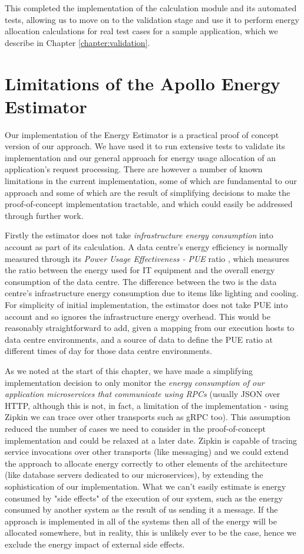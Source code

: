 This completed the implementation of the calculation module and its automated tests, allowing us to move on to the validation stage and use it to perform energy allocation calculations for real test cases for a sample application, which we describe in Chapter \ref{chapter:validation}.

\section{Limitations of the Apollo Energy Estimator}

Our implementation of the Energy Estimator is a practical proof of concept version of our approach.  We have used it to run extensive tests to validate its implementation and our general approach for energy usage allocation of an application's request processing.  There are however a number of known limitations in the current implementation, some of which are fundamental to our approach and some of which are the result of simplifying decisions to make the proof-of-concept implementation tractable, and which could easily be addressed through further work.

Firstly the estimator does not take \emph{infrastructure energy consumption} into account as part of its calculation.  A data centre's energy efficiency is normally measured through its \emph{Power Usage Effectiveness - PUE} ratio \cite{iso30134-pue}, which measures the ratio between the energy used for IT equipment and the overall energy consumption of the data centre.  The difference between the two is the data centre's infrastructure energy consumption due to items like lighting and cooling.  For simplicity of initial implementation, the estimator does not take PUE into account and so ignores the infrastructure energy overhead.  This would be reasonably straightforward to add, given a mapping from our execution hosts to data centre environments, and a source of data to define the PUE ratio at different times of day for those data centre environments.

As we noted at the start of this chapter, we have made a simplifying implementation decision to only monitor the \emph{energy consumption of our application microservices that communicate using RPCs} (usually JSON over HTTP, although this is not, in fact, a limitation of the implementation - using Zipkin we can trace over other transports such as gRPC too).  This assumption reduced the number of cases we need to consider in the proof-of-concept implementation and could be relaxed at a later date.  Zipkin is capable of tracing service invocations over other transports (like messaging) and we could extend the approach to allocate energy correctly to other elements of the architecture (like database servers dedicated to our microservices), by extending the sophistication of our implementation.  What we can't easily estimate is energy consumed by "side effects" of the execution of our system, such as the energy consumed by another system as the result of us sending it a message.  If the approach is implemented in all of the systems then all of the energy will be allocated somewhere, but in reality, this is unlikely ever to be the case, hence we exclude the energy impact of external side effects.

